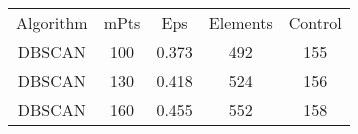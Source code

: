 \begin{table}
\begin{tabular}{ccccc}
Algorithm & mPts & Eps & Elements & Control \\
DBSCAN & 100 & 0.373 & 492 & 155 \\
DBSCAN & 130 & 0.418 & 524 & 156 \\
DBSCAN & 160 & 0.455 & 552 & 158 \\
\end{tabular}
\end{table}
